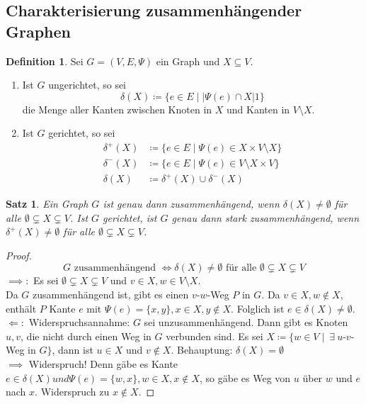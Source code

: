 \documentclass[a4paper,12pt]{article}
\newtheorem{satz}[axiom]{Satz}
\theoremstyle{definition}
\newtheorem{definition}[axiom]{Definition}
\let\oldexist\exists
\renewcommand{\exists}{\:\oldexist \: }
\begin{document}
	\subsection{Charakterisierung zusammenhängender Graphen}
	\begin{definition}
		Sei $G = (V, E, \Psi)$ ein Graph und $X \subseteq V$.
		\begin{enumerate}[label=(\alph*)]
			\item Ist $G$ ungerichtet, so sei 
			\[
				\delta(X) \coloneq \{e \in E \mid \lvert \Psi(e) \cap X \rvert 1\}
			\]
			die Menge aller Kanten zwischen Knoten in $X$ und Kanten in $V \setminus X$.
			\item Ist $G$ gerichtet, so sei
			\begin{align*}
				\delta^+(X) &\coloneq \{e \in E \mid \Psi(e) \in X \times V \setminus X\}\\
				\delta^-(X) &\coloneq \{e \in E \mid \Psi(e) \in V \setminus X \times V\}\\
				\delta(X) &\coloneq \delta^+(X) \cup \delta^-(X)
			\end{align*}
		\end{enumerate}
	\end{definition}
	\begin{satz}
		Ein Graph $G$ ist genau dann zusammenhängend, wenn $\delta(X) \neq \emptyset$ für alle $\emptyset \subsetneq X \subsetneq V$. Ist $G$ gerichtet, ist $G$ genau dann stark zusammenhängend, wenn $\delta^+(X) \neq \emptyset$ für alle $\emptyset \subsetneq X \subsetneq V$.
	\end{satz}
	\begin{proof}
		\[
			G \text{ zusammenhängend } \Longleftrightarrow \delta(X) \neq \emptyset \text{ für alle } \emptyset \subsetneq X \subsetneq V
		\]
		$\implies:$ Es sei $\emptyset \subsetneq X \subsetneq V$ und $v \in X, w \in V \setminus X$.\\[2ex]
		Da $G$ zusammenhängend ist, gibt es einen $v$-$w$-Weg $P$ in $G$. Da $v \in X, w \notin X$, enthält $P$ Kante $e$ mit $\Psi(e) = \{x, y\}, x \in X, y \notin X$. Folglich ist $e \in \delta(X) \neq \emptyset$.\\[2ex]
		$\Longleftarrow:$ Widerspruchsannahme: $G$ sei unzusammenhängend. Dann gibt es Knoten $u, v$, die nicht durch einen Weg in $G$ verbunden sind. Es sei $X \coloneq \{w \in V \mid \exists u$-$v$-Weg in $G\}$, dann ist $u \in X$ und $v \notin X$. Behauptung: $\delta(X) = \emptyset$\\[2ex]
		$\implies$ Widerspruch! Denn gäbe es Kante $e \in \delta(X) und \Psi(e) = \{w, x\}, w \in X, x \notin X$, so gäbe es Weg von $u$ über $w$ und $e$ nach $x$. Widerspruch zu $x \notin X.$
	\end{proof}
\end{document}
